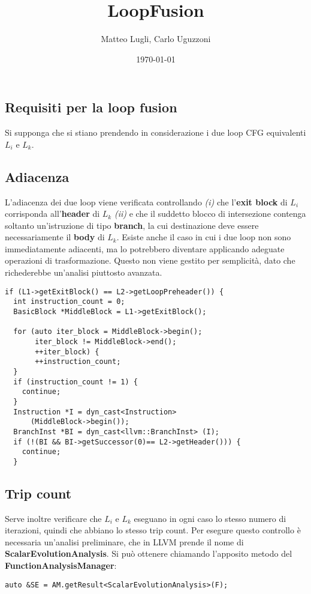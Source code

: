 \documentclass[letterpaper, 11pt]{article}
\author{Matteo Lugli, Carlo Uguzzoni}
\date{\today}
\title{LoopFusion}
\begin{document}
\maketitle
\tableofcontents

\newpage
\begin{multicols}{2}
\section{Requisiti per la loop fusion}
\label{sec:org7ed5afc}
Si supponga che si stiano prendendo in considerazione i due loop CFG equivalenti
\(L_{i}\) e \(L_{k}\).
\subsection{Adiacenza}
\label{sec:org64c18cc}
L'adiacenza dei due loop viene verificata controllando \emph{(i)} che l'\textbf{exit block} di
\(L_{i}\) corrisponda all'\textbf{header} di \(L_{k}\) \emph{(ii)} e che il suddetto blocco di intersezione
contenga soltanto un'istruzione di tipo \textbf{branch}, la cui destinazione deve essere necessariamente
il \textbf{body} di \(L_{k}\).
Esiste anche il caso in cui i due loop non sono immediatamente adiacenti, ma lo
potrebbero diventare applicando adeguate operazioni di trasformazione. Questo
non viene gestito per semplicità, dato che richederebbe un'analisi piuttosto avanzata.
\footnotesize
\begin{verbatim}
if (L1->getExitBlock() == L2->getLoopPreheader()) {
  int instruction_count = 0;
  BasicBlock *MiddleBlock = L1->getExitBlock();

  for (auto iter_block = MiddleBlock->begin(); 
	   iter_block != MiddleBlock->end(); 
	   ++iter_block) {
	   ++instruction_count;
  }
  if (instruction_count != 1) {
	continue;
  }
  Instruction *I = dyn_cast<Instruction> 
	  (MiddleBlock->begin());
  BranchInst *BI = dyn_cast<llvm::BranchInst> (I);
  if (!(BI && BI->getSuccessor(0)== L2->getHeader())) {
	continue;
  }
\end{verbatim}
\normalsize
\subsection{Trip count}
\label{sec:org1427caf}
Serve inoltre verificare che \(L_{i}\) e \(L_{k}\) eseguano in ogni caso
lo stesso numero di iterazioni, quindi che abbiano lo stesso trip count.
Per esegure questo controllo è necessaria un'analisi preliminare, che
in LLVM prende il nome di \textbf{ScalarEvolutionAnalysis}. Si può ottenere
chiamando l'apposito metodo del \textbf{FunctionAnalysisManager}: 
\footnotesize
\begin{verbatim}
auto &SE = AM.getResult<ScalarEvolutionAnalysis>(F);
\end{verbatim}
\normalsize

\end{multicols}
\end{document}
